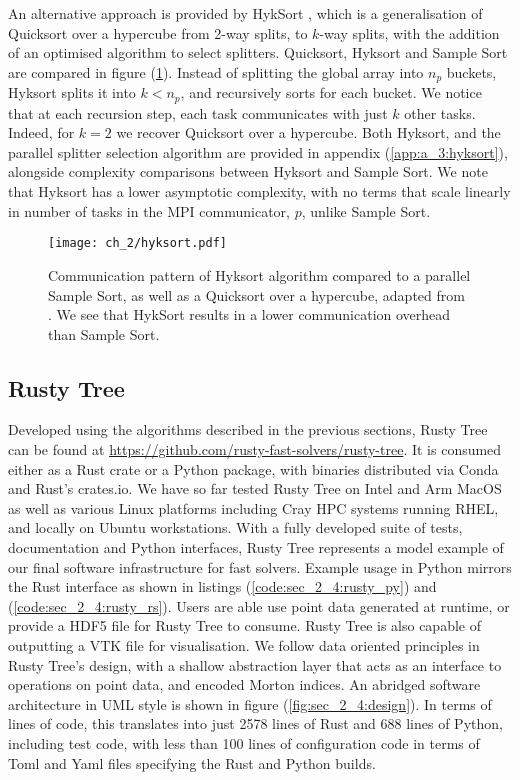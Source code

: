 An alternative approach is provided by HykSort \cite{sundar2013hyksort}, which is a generalisation of Quicksort over a hypercube \cite{wagar1987hyperquicksort} from 2-way splits, to $k$-way splits, with the addition of an optimised algorithm to select splitters. Quicksort, Hyksort and Sample Sort are compared in figure (\ref{fig:sec_2_4:hyksort}). Instead of splitting the global array into $n_p$ buckets, Hyksort splits it into $k < n_p$, and recursively sorts for each bucket. We notice that at each recursion step, each task communicates with just $k$ other tasks. Indeed, for $k=2$ we recover Quicksort over a hypercube. Both Hyksort, and the parallel splitter selection algorithm are provided in appendix (\ref{app:a_3:hyksort}), alongside complexity comparisons between Hyksort and Sample Sort. We note that Hyksort has a lower asymptotic complexity, with no terms that scale linearly in number of tasks in the MPI communicator, $p$, unlike Sample Sort.

\begin{figure}
    \centerline{\texttt{[image: ch\_2/hyksort.pdf]}}
    \caption{Communication pattern of Hyksort algorithm compared to a parallel Sample Sort, as well as a Quicksort over a hypercube, adapted from \cite{sundar2013hyksort}. We see that HykSort results in a lower communication overhead than Sample Sort.}
    \label{fig:sec_2_4:hyksort}
\end{figure}

\subsection*{Rusty Tree}

Developed using the algorithms described in the previous sections, Rusty Tree can be found at \url{https://github.com/rusty-fast-solvers/rusty-tree}. It is consumed either as a Rust crate or a Python package, with binaries distributed via Conda and Rust's crates.io. We have so far tested Rusty Tree on Intel and Arm MacOS as well as various Linux platforms including Cray HPC systems running RHEL, and locally on Ubuntu workstations. With a fully developed suite of tests, documentation and Python interfaces, Rusty Tree represents a model example of our final software infrastructure for fast solvers. Example usage in Python mirrors the Rust interface as shown in listings (\ref{code:sec_2_4:rusty_py}) and (\ref{code:sec_2_4:rusty_rs}). Users are able use point data generated at runtime, or provide a HDF5 file for Rusty Tree to consume. Rusty Tree is also capable of outputting a VTK file for visualisation.  We follow data oriented principles in Rusty Tree's design, with a shallow abstraction layer that acts as an interface to operations on point data, and encoded Morton indices. An abridged software architecture in UML style is shown in figure (\ref{fig:sec_2_4:design}). In terms of lines of code, this translates into just 2578 lines of Rust and 688 lines of Python, including test code, with less than 100 lines of configuration code in terms of Toml and Yaml files specifying the Rust and Python builds.

